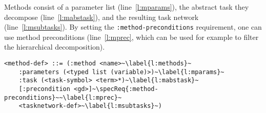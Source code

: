 \documentclass[letterpaper]{article} %
\begin{document}

%






%
%
Methods consist of a parameter list (line~\ref{l:mparams}), the abstract task they decompose (line~\ref{l:mabstask}), and the resulting task network (line~\ref{l:msubtasks}). By setting the \verb+:method-preconditions+ requirement, one can use method preconditions (line~\ref{l:mprec}, which can be used for example to filter the hierarchical decomposition).

\begin{lstlisting}[firstnumber=last, escapechar=~]
<method-def> ::= (:method <name>~\label{l:methods}~
    :parameters (<typed list (variable)>)~\label{l:mparams}~
    :task (<task-symbol> <term>*)~\label{l:mabstask}~
    [:precondition <gd>]~\specReq{:method-preconditions}~~\label{l:mprec}~
    <tasknetwork-def>~\label{l:msubtasks}~)
\end{lstlisting}
\end{document}

